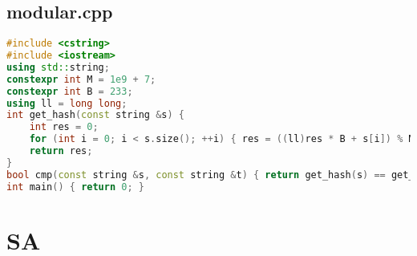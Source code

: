 \documentclass[9pt, a4paper, oneside]{book}
\begin{document}
\subsection{modular.cpp}
\begin{lstlisting}[language={C++}]
#include <cstring>
#include <iostream>
using std::string;
constexpr int M = 1e9 + 7;
constexpr int B = 233;
using ll = long long;
int get_hash(const string &s) {
    int res = 0;
    for (int i = 0; i < s.size(); ++i) { res = ((ll)res * B + s[i]) % M; }
    return res;
}
bool cmp(const string &s, const string &t) { return get_hash(s) == get_hash(t); }
int main() { return 0; }\end{lstlisting}
\section{SA}
\end{document}
